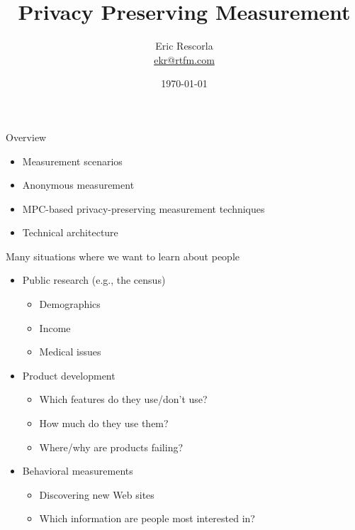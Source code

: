 \documentclass[helvetica]{beamer}
\title{Privacy Preserving Measurement}
\author{Eric Rescorla \\\url{ekr@rtfm.com}}
\date{\today}
\begin{document}
\begin{frame}
  \titlepage
\end{frame}

\begin{frame}{Overview}
  \begin{itemize}
  \item Measurement scenarios
  \item Anonymous measurement
  \item MPC-based privacy-preserving measurement techniques
  \item Technical architecture
  \end{itemize}
\end{frame}

  
\begin{frame}{Many situations where we want to learn about people}

  \begin{itemize}
  \item Public research (e.g., the census)
    \begin{itemize}
    \item Demographics
    \item Income
    \item Medical issues
    \end{itemize}
    
  \item Product development
    \begin{itemize}
    \item Which features do they use/don't use?
    \item How much do they use them?
    \item Where/why are products failing?      
    \end{itemize}
    
  \item Behavioral measurements
    \begin{itemize}
    \item Discovering new Web sites
    \item Which information are people most interested in?     
    \end{itemize}
  \end{itemize}
\end{frame}
\end{document}
